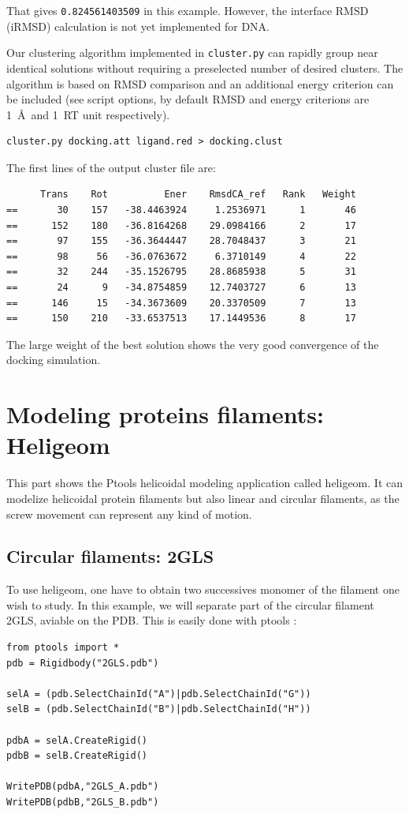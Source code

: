 \documentclass[12pt,a4paper]{article}
\begin{document}
That gives {\tt 0.824561403509} in this example. However, the interface 
RMSD (iRMSD) calculation is not yet implemented for DNA.


Our clustering algorithm implemented in {\tt cluster.py} can rapidly group
near identical solutions without requiring a preselected number of desired clusters.
The algorithm is based on RMSD comparison and an additional energy criterion can 
be included (see script options, by default RMSD and energy criterions are 
1~\AA\ and 1~RT unit respectively).

\begin{verbatim}
cluster.py docking.att ligand.red > docking.clust
\end{verbatim}

The first lines of the output cluster file are:

\linenumbers*
\begin{verbatim}
      Trans    Rot          Ener    RmsdCA_ref   Rank   Weight
==       30    157   -38.4463924     1.2536971      1       46
==      152    180   -36.8164268    29.0984166      2       17
==       97    155   -36.3644447    28.7048437      3       21
==       98     56   -36.0763672     6.3710149      4       22
==       32    244   -35.1526795    28.8685938      5       31
==       24      9   -34.8754859    12.7403727      6       13
==      146     15   -34.3673609    20.3370509      7       13
==      150    210   -33.6537513    17.1449536      8       17
\end{verbatim}
\nolinenumbers

The large weight of the best solution shows the very good convergence of the
docking simulation.



\newpage
\section{Modeling proteins filaments: Heligeom}
This part shows the Ptools helicoidal modeling application called heligeom. It can
modelize helicoidal protein filaments but also linear and circular filaments, as 
the screw movement can represent any kind of motion. 



\subsection{Circular filaments: 2GLS}
To use heligeom, one have to obtain two successives monomer of the filament one wish to study. In this example, we will separate part of the circular filament 2GLS, aviable on the PDB. This is easily done with ptools :
\begin{verbatim}
from ptools import *
pdb = Rigidbody("2GLS.pdb")

selA = (pdb.SelectChainId("A")|pdb.SelectChainId("G"))
selB = (pdb.SelectChainId("B")|pdb.SelectChainId("H"))

pdbA = selA.CreateRigid()
pdbB = selB.CreateRigid()

WritePDB(pdbA,"2GLS_A.pdb")
WritePDB(pdbB,"2GLS_B.pdb")
\end{verbatim}
\end{document}
